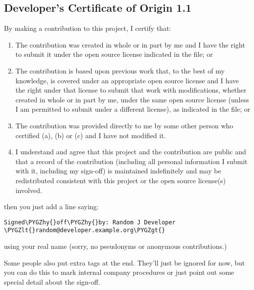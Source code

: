 \documentclass[a4paper,8pt,english]{sphinxmanual}
\def\PYGZlt{\char`\<}
\def\PYGZgt{\char`\>}
\def\PYGZhy{\char`\-}
\begin{document}
\subsection{Developer's Certificate of Origin 1.1}
\label{process/submitting-patches:developer-s-certificate-of-origin-1-1}
By making a contribution to this project, I certify that:
\begin{enumerate}
\item {} 
The contribution was created in whole or in part by me and I
have the right to submit it under the open source license
indicated in the file; or

\item {} 
The contribution is based upon previous work that, to the best
of my knowledge, is covered under an appropriate open source
license and I have the right under that license to submit that
work with modifications, whether created in whole or in part
by me, under the same open source license (unless I am
permitted to submit under a different license), as indicated
in the file; or

\item {} 
The contribution was provided directly to me by some other
person who certified (a), (b) or (c) and I have not modified
it.

\item {} 
I understand and agree that this project and the contribution
are public and that a record of the contribution (including all
personal information I submit with it, including my sign-off) is
maintained indefinitely and may be redistributed consistent with
this project or the open source license(s) involved.

\end{enumerate}

then you just add a line saying:

\begin{Verbatim}[commandchars=\\\{\}]
Signed\PYGZhy{}off\PYGZhy{}by: Random J Developer \PYGZlt{}random@developer.example.org\PYGZgt{}
\end{Verbatim}

using your real name (sorry, no pseudonyms or anonymous contributions.)

Some people also put extra tags at the end.  They'll just be ignored for
now, but you can do this to mark internal company procedures or just
point out some special detail about the sign-off.
\end{document}
